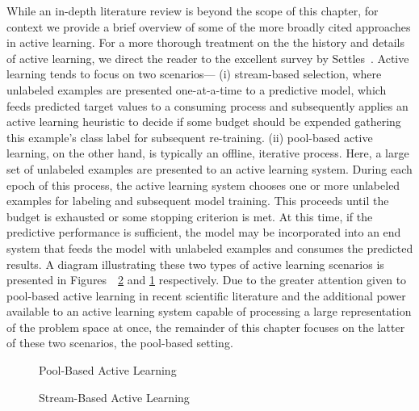 While an in-depth literature review is beyond the scope of this chapter, for context we provide a brief overview of some of the more broadly cited approaches in active learning. For a more thorough treatment on the the history and details of active learning, we direct the reader to the excellent survey by Settles~\cite{settles.tr09}. Active learning tends to focus on two scenarios--- (i) stream-based selection, where unlabeled examples are presented one-at-a-time to a predictive model, which feeds predicted target values to a consuming process and subsequently applies an active learning heuristic to decide if some budget should be expended gathering this example's class label for subsequent re-training. (ii) pool-based active learning, on the other hand, is typically an offline, iterative process. Here, a large set of unlabeled examples are presented to an active learning system. During each epoch of this process, the active learning system chooses one or more unlabeled examples for labeling and subsequent model  training. This proceeds until the budget is exhausted or some stopping criterion is met. At this time, if the predictive performance is sufficient, the model may be incorporated into an end system that feeds the model with unlabeled examples and consumes the predicted results. A diagram illustrating these two types of active learning scenarios is presented in Figures~~\ref{fig:streambased} and \ref{fig:poolbased} respectively. Due to the greater attention given to pool-based active learning in recent scientific literature and the additional power available to an active learning system capable of processing a large representation of the problem space at once, the remainder of this chapter focuses on the latter of these two scenarios, the pool-based setting.

\begin{figure}[hbt]
\begin{center}
\end{center}
\caption{Pool-Based Active Learning}
\label{fig:poolbased}
\end{figure}

\begin{figure}[hbt]
\begin{center}
\end{center}
\caption{Stream-Based Active Learning}
\label{fig:streambased}
\end{figure}


